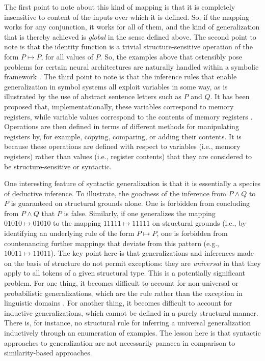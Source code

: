 The first point to note about this kind of mapping is that it is completely insensitive to content of the inputs over which it is defined. So, if the mapping works for any conjunction, it works for all of them, and the kind of generalization that is thereby achieved is \textit{global} in the sense defined above. The second point to note is that the identity function is a trivial structure-sensitive operation of the form $P \mapsto P$, for all values of $P$. So, the examples above that ostensibly pose problems for certain neural architectures are naturally handled within a symbolic framework \citep{Hadley:2009,Marcus:1998}. The third point to note is that the inference rules that enable generalization in symbol systems all exploit variables in some way, as is illustrated by the use of abstract sentence letters such as $P$ and $Q$. It has been proposed that, implementationally, these variables correspond to memory registers, while variable values correspond to the contents of memory registers \citep{Marcus:1998}. Operations are then defined in terms of different methods for manipulating registers by, for example, copying, comparing, or adding their contents. It is because these operations are defined with respect to variables (i.e., memory registers) rather than values (i.e., register contents) that they are considered to be structure-sensitive or syntactic.

One interesting feature of syntactic generalization is that it is essentially a species of deductive inference. To illustrate, the goodness of the inference from $P \land Q$ to $P$ is guaranteed on structural grounds alone. One is forbidden from concluding from $P \land Q$ that $P$ is false. Similarly, if one generalizes the mapping $01010 \mapsto 01010$ to the mapping $11111 \mapsto 11111$ on structural grounds (i.e., by identifying an underlying rule of the form $P \mapsto P$, one is forbidden from countenancing further mappings that deviate from this pattern (e.g., $10011 \mapsto 11011$). The key point here is that generalizations and inferences made on the basis of structure do not permit exceptions: they are \textit{universal} in that they apply to all tokens of a given structural type. This is a potentially significant problem. For one thing, it becomes difficult to account for non-universal or probabilistic generalizations, which are the rule rather than the exception in linguistic domains \citep{SmolenskyLegendre:2006,ChaterManning:2006,Manning:2015,Seidenberg:1997}. For another thing, it becomes difficult to account for inductive generalizations, which cannot be defined in a purely structural manner. There is, for instance, no structural rule for inferring a universal generalization inductively through an enumeration of examples. The lesson here is that syntactic approaches to generalization are not necessarily panacea in comparison to similarity-based approaches. 

